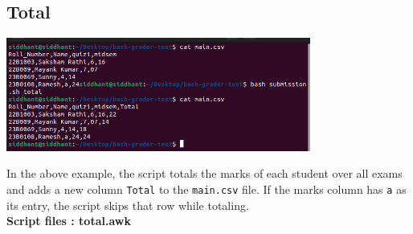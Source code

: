 \documentclass{article}
\begin{document}
\subsection{Total}
\begin{center}
    \includegraphics[width=10cm]{total.png}
\end{center}
In the above example, the script totals the marks of each student over all exams and adds a new column \verb"Total" to the \verb"main.csv" file.
If the marks column has \verb"a" as its entry, the script skips that row while totaling.\\
\textbf{Script files : total.awk }
\end{document}
